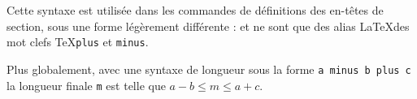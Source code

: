 \begin{latexcode}
\vspace{2.5cm minus 1.5cm plus 0.5cm}
\end{latexcode}

Cette syntaxe est utilisée dans les commandes de définitions des en-têtes de section, sous une forme légèrement différente :  et  ne sont que des alias \LaTeX des mot clefs \TeX \verb|plus| et \verb|minus|.

Plus globalement, avec une syntaxe de longueur sous la forme \verb|a minus b plus c| la longueur finale \verb|m| est telle que $ a - b \leq m \leq a + c $.  

